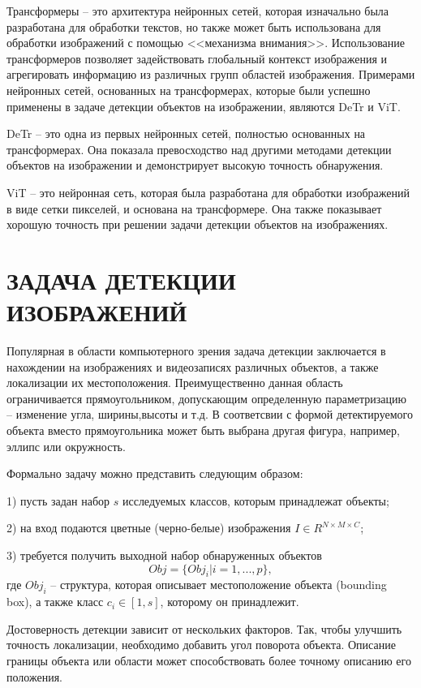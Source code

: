 \documentclass[14pt,a4paper]{extarticle}
\begin{document}
Трансформеры -- это архитектура нейронных сетей, которая изначально была разработана для обработки текстов, но также может быть использована для обработки изображений с помощью <<механизма внимания>>. Использование трансформеров позволяет задействовать глобальный контекст изображения и агрегировать информацию из различных групп областей изображения. Примерами нейронных сетей, основанных на трансформерах, которые были успешно применены в задаче детекции объектов на изображении, являются DeTr и ViT.

DeTr -- это одна из первых нейронных сетей, полностью основанных на трансформерах. Она показала превосходство над другими методами детекции объектов на изображении и демонстрирует высокую точность обнаружения. 

ViT -- это нейронная сеть, которая была разработана для обработки изображений в виде сетки пикселей, и основана на трансформере. Она также показывает хорошую точность при решении задачи детекции объектов на изображениях.

\newpage
\section{ЗАДАЧА ДЕТЕКЦИИ ИЗОБРАЖЕНИЙ}
Популярная в области компьютерного зрения задача детекции заключается в нахождении на изображениях и видеозаписях различных объектов, а также локализации их местоположения. Преимущественно данная область ограничивается прямоугольником, допускающим определенную параметризацию -- изменение угла, ширины,высоты и т.д. В соответсвии с формой детектируемого объекта вместо прямоугольника может быть выбрана другая фигура, например, эллипс или окружность.

Формально задачу можно представить следующим образом:

1) пусть задан набор $s$ исследуемых классов, которым принадлежат объекты;

2) на вход подаются цветные (черно-белые) изображения $I \in R^{N \times M \times C}$;

3) требуется получить выходной набор обнаруженных объектов 
$$Obj = \{Obj_i | i = 1,..., p\},$$ 
где $Obj_i$ -- структура, которая описывает местоположение объекта (bounding box), а также класс $c_i \in [1, s]$, которому он принадлежит.  

Достоверность детекции зависит от нескольких факторов. Так, чтобы улучшить точность локализации, необходимо добавить угол поворота объекта. Описание границы объекта или области может способствовать более точному описанию его положения. 
\end{document}
